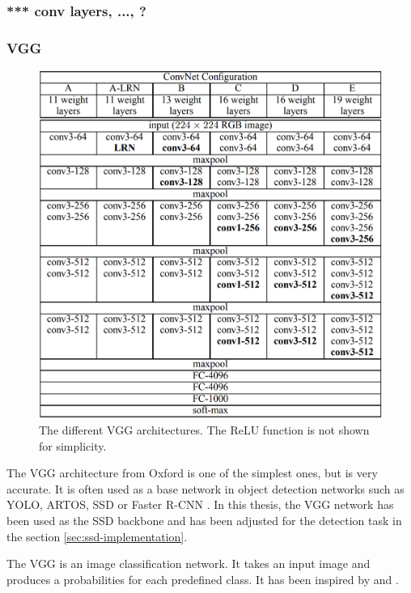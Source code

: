 \documentclass[a4paper,12pt,titlepage]{article}
\numberwithin{figure}{section}
\begin{document}
\subsubsection{*** conv layers, ..., ?}
\subsubsection{VGG}
\label{sec:vgg}

\begin{figure}[h!]
\centering
\includegraphics[width=1\linewidth]{fig/vgg.png}
\caption{The different VGG architectures. The ReLU function is not shown for simplicity. \cite{simonyan2014very}}
\label{fig:vgg}
\end{figure}

The VGG\cite{simonyan2014very} architecture from Oxford is one of the simplest ones, but is very accurate. It is often used as a base network in object detection networks such as YOLO\cite{redmon2016you}, ARTOS\cite{barz2017fast}, SSD \cite{liu2016ssd} or Faster R-CNN \cite{faster-rcnn}. In this thesis, the VGG network has been used as the SSD backbone and has been adjusted for the detection task in the section \ref{sec:ssd-implementation}. 

The VGG is an image classification network. It takes an input image and produces a probabilities for each predefined class. It has been inspired by \cite{ciresan2011flexible} and \cite{krizhevsky2012imagenet}.
\end{document}

